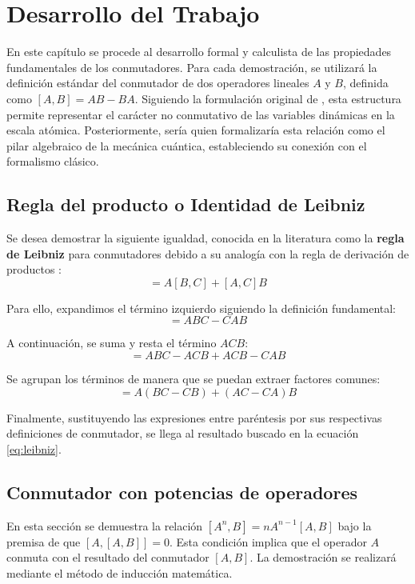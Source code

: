 \documentclass[11pt,a4paper,spanish]{book}
\begin{document}
\chapter{Desarrollo del Trabajo}

En este capítulo se procede al desarrollo formal y calculista de las propiedades fundamentales de los conmutadores. Para cada demostración, se utilizará la definición estándar del conmutador de dos operadores lineales ${A}$ y ${B}$, definida como $[{A}, {B}] = {A}{B} - {B}{A}$. Siguiendo la formulación original de \cite{heisenberg1925}, esta estructura permite representar el carácter no conmutativo de las variables dinámicas en la escala atómica. Posteriormente, sería \cite{dirac1925} quien formalizaría esta relación como el pilar algebraico de la mecánica cuántica, estableciendo su conexión con el formalismo clásico.

\section{Regla del producto o Identidad de Leibniz} \label{sec:regla_producto}

Se desea demostrar la siguiente igualdad, conocida en la literatura como la \textbf{regla de Leibniz} para conmutadores debido a su analogía con la regla de derivación de productos \citep{messiah1961}:
\begin{equation}
[AB, C] = A[B, C] + [A, C]B \label{eq:leibniz}
\end{equation}

Para ello, expandimos el término izquierdo siguiendo la definición fundamental:
\begin{equation}
[AB, C] = ABC - CAB
\end{equation}

A continuación, se suma y resta el término $ACB$:
\begin{equation}
[AB, C] = ABC - ACB + ACB - CAB
\end{equation}

Se agrupan los términos de manera que se puedan extraer factores comunes:
\begin{equation}
[AB, C] = A(BC - CB) + (AC - CA)B
\end{equation}

Finalmente, sustituyendo las expresiones entre paréntesis por sus respectivas definiciones de conmutador, se llega al resultado buscado en la ecuación \ref{eq:leibniz}.

\section{Conmutador con potencias de operadores} \label{sec:potencias}
En esta sección se demuestra la relación $[A^n, B] = n A^{n-1} [A, B]$ bajo la premisa de que $[A, [A, B]] = 0$. Esta condición implica que el operador $A$ conmuta con el resultado del conmutador $[A, B]$. La demostración se realizará mediante el método de inducción matemática.
\end{document}
